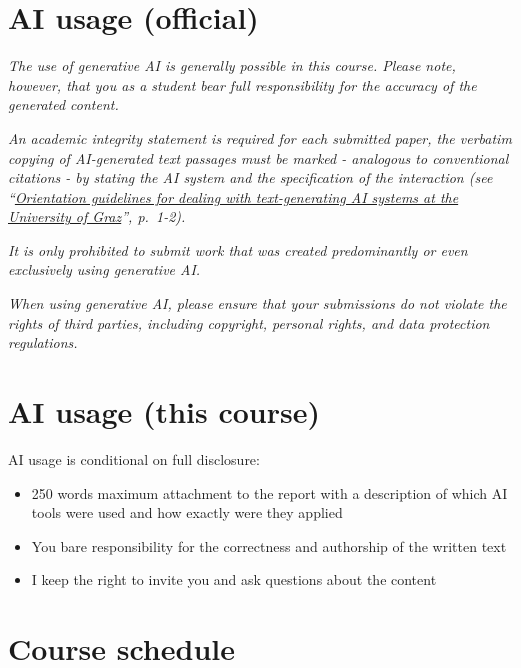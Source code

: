 \documentclass[
  letterpaper,
]{report}
\begin{document}
\section*{AI usage (official)}\label{sec-ai-uni}


\emph{The use of generative AI is generally possible in this course.
Please note, however, that you as a student bear full responsibility for
the accuracy of the generated content.}

\emph{An academic integrity statement is required for each submitted
paper, the verbatim copying of AI-generated text passages must be marked
- analogous to conventional citations - by stating the AI system and the
specification of the interaction (see
``\href{https://static.uni-graz.at/fileadmin/_files/_project_sites/_digitalelehre/Orientierungsrahmen/KI-Orientierungsrahmen_230901.pdf}{Orientation
guidelines for dealing with text-generating AI systems at the University
of Graz}'', p.~1-2).}

\emph{It is only prohibited to submit work that was created
predominantly or even exclusively using generative AI.}

\emph{When using generative AI, please ensure that your submissions do
not violate the rights of third parties, including copyright, personal
rights, and data protection regulations.}

\section*{AI usage (this course)}\label{sec-ai-course}


AI usage is conditional on full disclosure:

\begin{itemize}
\item
  250 words maximum attachment to the report with a description of which
  AI tools were used and how exactly were they applied
\item
  You bare responsibility for the correctness and authorship of the
  written text
\item
  I keep the right to invite you and ask questions about the content
\end{itemize}

\section*{Course schedule}\label{course-schedule}
\end{document}
